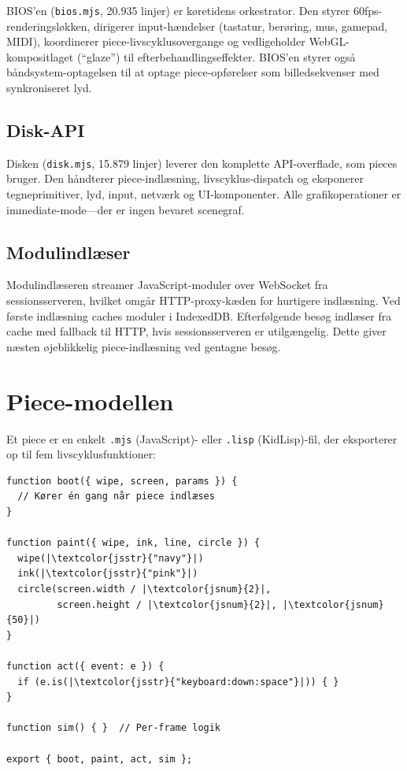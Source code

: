\documentclass[10pt,letterpaper,twocolumn]{article}
\begin{document}
BIOS'en (\texttt{bios.mjs}, 20.935 linjer) er køretidens orkestrator. Den styrer 60fps-renderingsløkken, dirigerer input-hændelser (tastatur, berøring, mus, gamepad, MIDI), koordinerer piece-livscyklusovergange og vedligeholder WebGL-kompositlaget (``glaze'') til efterbehandlingseffekter. BIOS'en styrer også båndsystem-optagelsen til at optage piece-opførelser som billedsekvenser med synkroniseret lyd.

\subsection{Disk-API}

Disken (\texttt{disk.mjs}, 15.879 linjer) leverer den komplette API-overflade, som pieces bruger. Den håndterer piece-indlæsning, livscyklus-dispatch og eksponerer tegneprimitiver, lyd, input, netværk og UI-komponenter. Alle grafikoperationer er immediate-mode---der er ingen bevaret scenegraf.

\subsection{Modulindlæser}

Modulindlæseren streamer JavaScript-moduler over WebSocket fra sessionsserveren, hvilket omgår HTTP-proxy-kæden for hurtigere indlæsning. Ved første indlæsning caches moduler i IndexedDB. Efterfølgende besøg indlæser fra cache med fallback til HTTP, hvis sessionsserveren er utilgængelig. Dette giver næsten øjeblikkelig piece-indlæsning ved gentagne besøg.


\section{Piece-modellen}
\label{sec:pieces}

Et piece er en enkelt \texttt{.mjs} (JavaScript)- eller \texttt{.lisp} (KidLisp)-fil, der eksporterer op til fem livscyklusfunktioner:

\begin{lstlisting}[style=acjsstyle]
function boot({ wipe, screen, params }) {
  // Kører én gang når piece indlæses
}

function paint({ wipe, ink, line, circle }) {
  wipe(|\textcolor{jsstr}{"navy"}|)
  ink(|\textcolor{jsstr}{"pink"}|)
  circle(screen.width / |\textcolor{jsnum}{2}|,
         screen.height / |\textcolor{jsnum}{2}|, |\textcolor{jsnum}{50}|)
}

function act({ event: e }) {
  if (e.is(|\textcolor{jsstr}{"keyboard:down:space"}|)) { }
}

function sim() { }  // Per-frame logik

export { boot, paint, act, sim };
\end{lstlisting}
\end{document}
